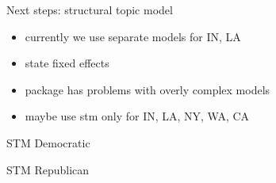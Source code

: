 \documentclass[12pt]{beamer}
\begin{document}
\begin{frame}{Next steps: structural topic model}
\begin{itemize}
	\item currently we use separate models for IN, LA
	\item state fixed effects
	\item package has problems with overly complex models
	\item maybe use stm only for IN, LA, NY, WA, CA
\end{itemize}
\end{frame}

\begin{frame}{STM Democratic}

\end{frame}

\begin{frame}{STM Republican}

\end{frame}
\end{document}
